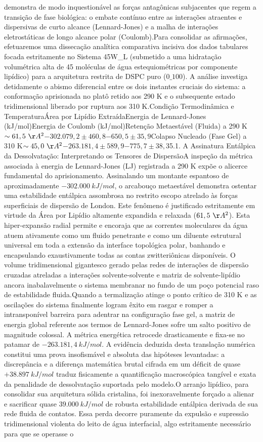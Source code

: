demonstra de modo inquestionável as forças antagônicas subjacentes que regem a transição de fase biológica: o embate contínuo entre as interações atraentes e dispersivas de curto alcance (Lennard-Jones) e a malha de interações eletrostáticas de longo alcance polar (Coulomb).Para consolidar as afirmações, efetuaremos uma dissecação analítica comparativa incisiva dos dados tabulares focada estritamente no Sistema 45W\_L (submetido a uma hidratação volumétrica alta de 45 moléculas de água estequiométricas por componente lipídico) para a arquitetura restrita de DSPC puro ($0\_100$). A análise investiga detidamente o abismo diferencial entre os dois instantes cruciais do sistema: a conformação aprisionada no platô retido aos 290 K e o subsequente estado tridimensional liberado por ruptura aos 310 K.Condição Termodinâmica e TemperaturaÁrea por Lipídio ExtraídaEnergia de Lennard-Jones (kJ/mol)Energia de Coulomb (kJ/mol)Retenção Metaestável (Fluida) a 290 K$\sim61,5~\AA^2$$-302.079,2 \pm 460,8$$-650,5 \pm 35,9$Colapso Nucleado (Fase Gel) a 310 K$\sim45,0~\AA^2$$-263.181,4 \pm 589,9$$-775,7 \pm 38,3$5.1. A Assinatura Entálpica da Dessolvatação: Interpretando os Tensores de DispersãoA inspeção da métrica associada à energia de Lennard-Jones (LJ) registrada a 290 K expõe o alicerce fundamental do aprisionamento. Assinalando um montante espantoso de aproximadamente $-302.000~kJ/mol$, o arcabouço metaestável demonstra ostentar uma estabilidade entálpica assombrosa no restrito escopo atrelado às forças superficiais de dispersão de London. Este fenômeno é justificado estritamente em virtude da Área por Lipídio altamente expandida e relaxada ($61,5~\AA^2$). Esta hiper-expansão radial permite e encoraja que as correntes moleculares da água atuem ativamente como um fluido penetrante e como um diluente estrutural universal em toda a extensão da interface topológica polar, banhando e encapsulando exaustivamente todas as contas zwitteriônicas disponíveis. O volume tridimensional gigantesco gerado pelas redes de interações de dispersão cruzadas atreladas a interações solvente-solvente e matriz de solvente-lipídio ancora inabalavelmente o sistema membranar no fundo de um poço potencial raso de estabilidade fluida.Quando a termalização atinge o ponto crítico de 310 K e as oscilações do sistema finalmente logram êxito em rasgar e romper a intransponível barreira para adentrar na configuração fase gel, a matriz de energia global referente aos termos de Lennard-Jones sofre um salto positivo de magnitude colossal. A métrica energética retrocede drasticamente e fixa-se no patamar de $-263.181,4~kJ/mol$. A evidência deduzida desta translação numérica constitui uma prova insofismável e absoluta das hipóteses levantadas: a discrepância e a diferença matemática brutal cifrada em um déficit de quase $+38.897~kJ/mol$ traduz fisicamente a quantificação macroscópica tangível e exata da penalidade de dessolvatação suportada pelo modelo.O arranjo lipídico, para consolidar sua arquitetura sólida cristalina, foi inexoravelmente forçado a alienar e sacrificar quase $39.000~kJ/mol$ de robusta estabilidade entálpica derivada de sua rede fluida de contatos. Essa perda decorre puramente da expulsão e supressão tridimensional violenta do leito de água interfacial, algo estritamente necessário para que se operasse o 